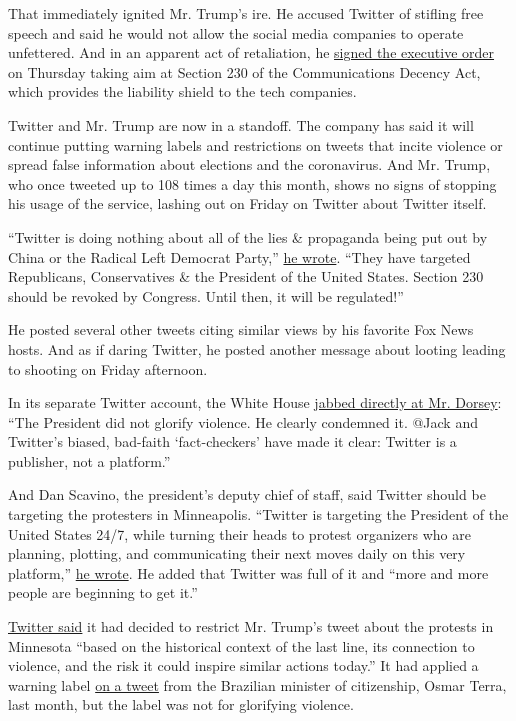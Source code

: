 That immediately ignited Mr. Trump's ire. He accused Twitter of stifling
free speech and said he would not allow the social media companies to
operate unfettered. And in an apparent act of retaliation, he
\href{https://www.nytimes.com/2020/05/28/us/politics/trump-jack-dorsey.html}{signed
the executive order} on Thursday taking aim at Section 230 of the
Communications Decency Act, which provides the liability shield to the
tech companies.

Twitter and Mr. Trump are now in a standoff. The company has said it
will continue putting warning labels and restrictions on tweets that
incite violence or spread false information about elections and the
coronavirus. And Mr. Trump, who once tweeted up to 108 times a day this
month, shows no signs of stopping his usage of the service, lashing out
on Friday on Twitter about Twitter itself.

``Twitter is doing nothing about all of the lies \& propaganda being put
out by China or the Radical Left Democrat Party,''
\href{https://twitter.com/realDonaldTrump/status/1266326065833824257}{he
wrote}. ``They have targeted Republicans, Conservatives \& the President
of the United States. Section 230 should be revoked by Congress. Until
then, it will be regulated!''

He posted several other tweets citing similar views by his favorite Fox
News hosts. And as if daring Twitter, he posted another message about
looting leading to shooting on Friday afternoon.

In its separate Twitter account, the White House
\href{https://twitter.com/WhiteHouse/status/1266373803870806023}{jabbed
directly at Mr. Dorsey}: ``The President did not glorify violence. He
clearly condemned it. @Jack and Twitter's biased, bad-faith
`fact-checkers' have made it clear: Twitter is a publisher, not a
platform.''

And Dan Scavino, the president's deputy chief of staff, said Twitter
should be targeting the protesters in Minneapolis. ``Twitter is
targeting the President of the United States 24/7, while turning their
heads to protest organizers who are planning, plotting, and
communicating their next moves daily on this very platform,''
\href{https://twitter.com/Scavino45/status/1266343153466060803}{he
wrote}. He added that Twitter was full of it and ``more and more people
are beginning to get it.''

\href{https://twitter.com/TwitterComms/status/1266267446979129345}{Twitter
said} it had decided to restrict Mr. Trump's tweet about the protests in
Minnesota ``based on the historical context of the last line, its
connection to violence, and the risk it could inspire similar actions
today.'' It had applied a warning label
\href{https://twitter.com/OsmarTerra/status/1246474430676643842}{on a
tweet} from the Brazilian minister of citizenship, Osmar Terra, last
month, but the label was not for glorifying violence.

